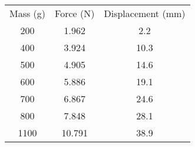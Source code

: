 \begin{table}[]
	\begin{tabular}{ccc}
		Mass (g) & Force (N) & Displacement (mm) \\
		200      & 1.962     & 2.2               \\
		400      & 3.924     & 10.3              \\
		500      & 4.905     & 14.6              \\
		600      & 5.886     & 19.1              \\
		700      & 6.867     & 24.6              \\
		800      & 7.848     & 28.1              \\
		1100     & 10.791    & 38.9
	\end{tabular}
\end{table}